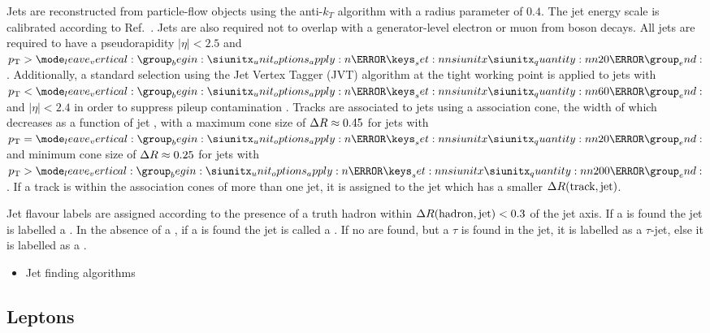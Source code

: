 Jets are reconstructed from particle-flow objects \cite{PERF-2015-09} using the anti-$k_T$ algorithm \cite{Cacciari:2008gp} with a radius parameter of $0.4$.
The jet energy scale is calibrated according to Ref.~\cite{PERF-2016-04}.
Jets are also required not to overlap with a generator-level electron or muon from \Wboson boson decays.
All jets are required to have a pseudorapidity $|\eta| < 2.5$ and $\pt > \SI{20}{\GeV}$. 
Additionally, a standard selection using the Jet Vertex Tagger (JVT) algorithm at the tight working point is applied to jets with $\pt < \SI{60}{\GeV}$ and $|\eta| < 2.4$ in order to suppress pileup contamination \cite{ATLAS-CONF-2014-018}.
Tracks are associated to jets using a \DeltaR association cone, the width of which decreases as a function of jet \pt, with a maximum cone size of $\Delta R \approx 0.45$ for jets with $\pt = \SI{20}{\GeV}$ and minimum cone size of $\Delta R \approx 0.25$ for jets with $\pt > \SI{200}{\GeV}$. 
If a track is within the association cones of more than one jet, it is assigned to the jet which has a smaller $\Delta R(\text{track}, \text{jet})$.

Jet flavour labels are assigned according to the presence of a truth hadron within ${\Delta R(\text{hadron},\text{jet})<0.3}$ of the jet axis. If a \bhadron is found the jet is labelled a \bjet. In the absence of a \bhadron, if a \chadron is found the jet is called a \cjet.
If no \borchadrons are found, but a $\tau$ is found in the jet, it is labelled as a $\tau$-jet, else it is labelled as a \ljet.


\begin{itemize}
  \item Jet finding algorithms
\end{itemize}



\subsection{Leptons}\label{sec:leptons}